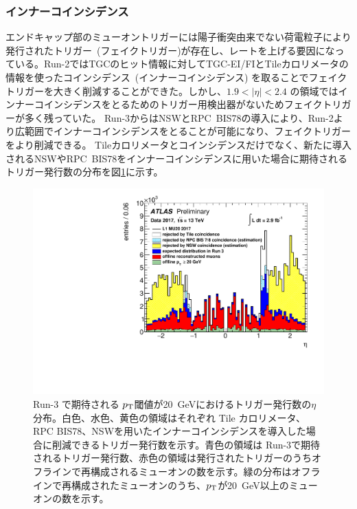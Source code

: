 \subsubsection{インナーコインシデンス}\label{innnercoin}
エンドキャップ部のミューオントリガーには陽子衝突由来でない荷電粒子により発行されたトリガー~(フェイクトリガー)が存在し、レートを上げる要因になっている。Run-2ではTGCのヒット情報に対してTGC-EI/FIとTileカロリメータの情報を使ったコインシデンス~(インナーコインシデンス) を取ることでフェイクトリガーを大きく削減することができた。しかし、$1.9 < |\eta| < 2.4$ の領域ではインナーコインシデンスをとるためのトリガー用検出器がないためフェイクトリガーが多く残っていた。
Run-3からはNSWとRPC~BIS78の導入により、Run-2より広範囲でインナーコインシデンスをとることが可能になり、フェイクトリガーをより削減できる。
Tileカロリメータとコインシデンスだけでなく、新たに導入されるNSWやRPC~BIS78をインナーコインシデンスに用いた場合に期待されるトリガー発行数の分布を図\ref{fig:Rate_innercoincidence}に示す。

\begin{figure}[tb]
  \centering
    \includegraphics[clip, width=14cm]{fig/3/ATL-COM-DAQ-2018-033-fig2.pdf}
  \caption{Run-3 で期待される $p_{\rm{T}}$閾値が20~GeVにおけるトリガー発行数の$\eta$分布\cite{article:ATLASpublic}。白色、水色、黄色の領域はそれぞれ Tile カロリメータ、RPC BIS78、NSWを用いたインナーコインシデンスを導入した場合に削減できるトリガー発行数を示す。青色の領域は Run-3で期待されるトリガー発行数、赤色の領域は発行されたトリガーのうちオフラインで再構成されるミューオンの数を示す。緑の分布はオフラインで再構成されたミューオンのうち、$p_{\rm{T}}$が20~GeV以上のミューオンの数を示す。}
  \label{fig:Rate_innercoincidence}
\end{figure}


